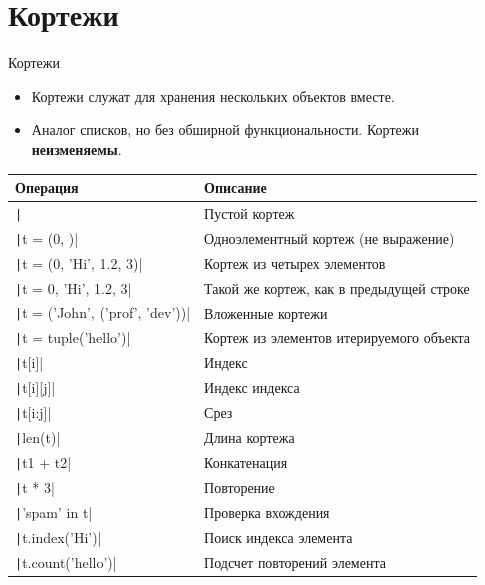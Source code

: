 \documentclass[aspectratio=169, mathserif]{beamer}%
\begin{document}
\section{Кортежи}
\sectionframe

\begin{frame}[fragile]{Кортежи}

\scriptsize
\begin{itemize}
\item Кортежи служат для хранения нескольких объектов вместе. 
\item Аналог списков, но без обширной функциональности. Кортежи \textcolor{extraorange}{\textbf{неизменяемы}}.
\end{itemize}

\begin{table}[h!]
\centering
\tiny
\begin{tabular}{|p{}|p{}|}
\hline
\textbf{Операция} & \textbf{Описание} \\ 
\hline 
\texttt|{t = ()| & Пустой кортеж \\
\texttt|t = (0, )| & Одноэлементный кортеж (не выражение) \\
\texttt|t = (0, 'Hi', 1.2, 3)| & Кортеж из четырех элементов \\
\texttt|t = 0, 'Hi', 1.2, 3| & Такой же кортеж, как в предыдущей строке \\
\texttt|t = ('John', ('prof', 'dev'))| & Вложенные кортежи \\
\texttt|t = tuple('hello')| & Кортеж из элементов итерируемого объекта \\
\texttt|t[i]| & Индекс \\
\texttt|t[i][j]| & Индекс индекса \\
\texttt|t[i:j]| & Срез \\
\texttt|len(t)| & Длина кортежа \\
\texttt|t1 + t2| & Конкатенация \\
\texttt|t * 3| & Повторение \\
\texttt|'spam' in t| & Проверка вхождения\\
\texttt|t.index('Hi')| & Поиск индекса элемента \\
\texttt|t.count('hello')| & Подсчет повторений элемента \\
\hline

\end{tabular}

\end{table}
\vfill
\end{frame}
\end{document}
